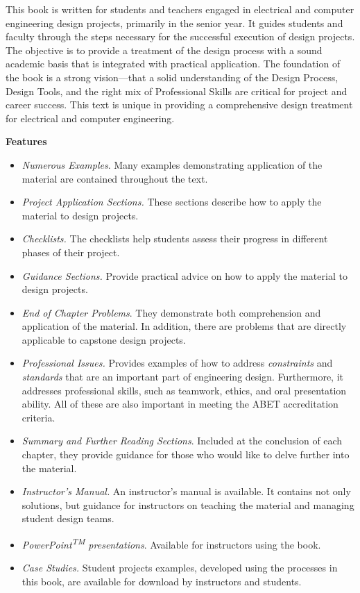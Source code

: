 This book is written for students and teachers engaged in electrical and
computer engineering design projects, primarily in the senior year. It
guides students and faculty through the steps necessary for the
successful execution of design projects. The objective is to provide a
treatment of the design process with a sound academic basis that is
integrated with practical application. The foundation of the book is a
strong vision---that a solid understanding of the Design Process, Design
Tools, and the right mix of Professional Skills are critical for project
and career success. This text is unique in providing a comprehensive
design treatment for electrical and computer engineering.

\textbf{Features}

\begin{itemize}
\item
  \emph{Numerous Examples}. Many examples demonstrating application of
  the material are contained throughout the text.
\item
  \emph{Project Application Sections.} These sections describe how to
  apply the material to design projects.
\item
  \emph{Checklists.} The checklists help students assess their progress
  in different phases of their project.
\item
  \emph{Guidance Sections.} Provide practical advice on how to apply the
  material to design projects.
\item
  \emph{End of Chapter Problems}. They demonstrate both comprehension
  and application of the material. In addition, there are problems that
  are directly applicable to capstone design projects.
\item
  \emph{Professional Issues.} Provides examples of how to address
  \emph{constraints} and \emph{standards} that are an important part of
  engineering design. Furthermore, it addresses professional skills,
  such as teamwork, ethics, and oral presentation ability. All of these
  are also important in meeting the ABET accreditation criteria.
\item
  \emph{Summary and Further Reading Sections}. Included at the
  conclusion of each chapter, they provide guidance for those who would
  like to delve further into the material.
\item
  \emph{Instructor's Manual.} An instructor's manual is available. It
  contains not only solutions, but guidance for instructors on teaching
  the material and managing student design teams.
\item
  \emph{PowerPoint\textsuperscript{TM} presentations}. Available for
  instructors using the book.
\item
  \emph{Case Studies.} Student projects examples, developed using the
  processes in this book, are available for download by instructors and
  students.
\end{itemize}
